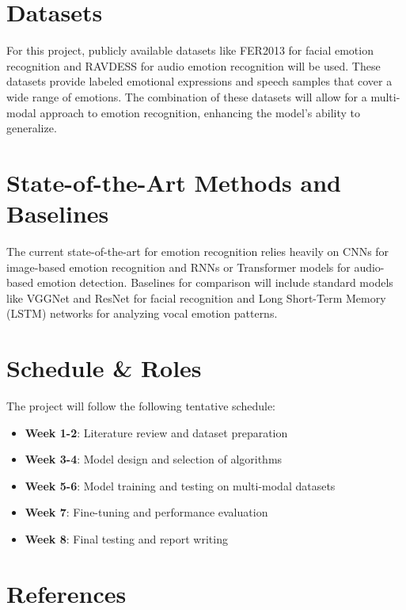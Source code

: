 \documentclass{article}
\begin{document}
\section{Datasets}
For this project, publicly available datasets like FER2013 for facial emotion recognition and RAVDESS for audio emotion recognition will be used. These datasets provide labeled emotional expressions and speech samples that cover a wide range of emotions. The combination of these datasets will allow for a multi-modal approach to emotion recognition, enhancing the model’s ability to generalize.

\section{State-of-the-Art Methods and Baselines}
The current state-of-the-art for emotion recognition relies heavily on CNNs for image-based emotion recognition and RNNs or Transformer models for audio-based emotion detection. Baselines for comparison will include standard models like VGGNet and ResNet for facial recognition and Long Short-Term Memory (LSTM) networks for analyzing vocal emotion patterns.

\section{Schedule \& Roles}
The project will follow the following tentative schedule:  
\begin{itemize}
    \item \textbf{Week 1-2}: Literature review and dataset preparation
    \item \textbf{Week 3-4}: Model design and selection of algorithms
    \item \textbf{Week 5-6}: Model training and testing on multi-modal datasets
    \item \textbf{Week 7}: Fine-tuning and performance evaluation
    \item \textbf{Week 8}: Final testing and report writing
\end{itemize}


\section{References}
\end{document}
